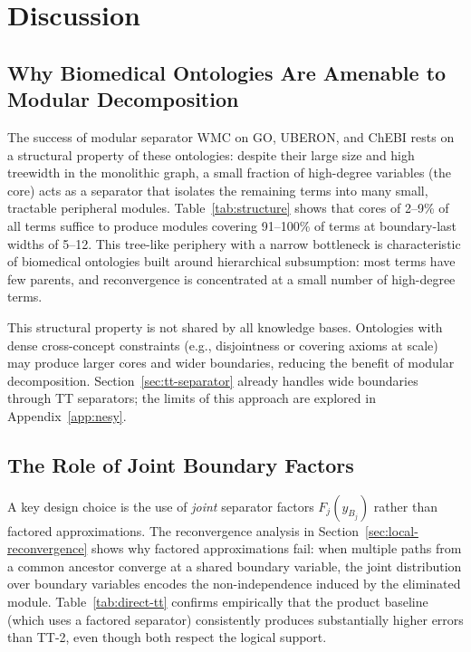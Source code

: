 \documentclass[12pt]{article}
\newcommand{\suppref}[1]{Appendix~\ref{#1}}
\begin{document}
\section{Discussion}
\label{sec:discussion}

\subsection{Why Biomedical Ontologies Are Amenable to Modular Decomposition}

The success of modular separator WMC on GO, UBERON, and ChEBI rests on
a structural property of these ontologies: despite their large size and
high treewidth in the monolithic graph, a small fraction of high-degree
variables (the core) acts as a separator that isolates the remaining
terms into many small, tractable peripheral modules. Table~\ref{tab:structure}
shows that cores of 2--9\% of all terms suffice to produce modules
covering 91--100\% of terms at boundary-last widths of 5--12. This
tree-like periphery with a narrow bottleneck is characteristic of
biomedical ontologies built around hierarchical subsumption: most terms
have few parents, and reconvergence is concentrated at a small number
of high-degree terms.

This structural property is not shared by all knowledge bases. Ontologies
with dense cross-concept constraints (e.g., disjointness or covering
axioms at scale) may produce larger cores and wider boundaries, reducing
the benefit of modular decomposition. Section~\ref{sec:tt-separator}
already handles wide boundaries through TT separators; the limits of
this approach are explored in \suppref{app:nesy}.

\subsection{The Role of Joint Boundary Factors}

A key design choice is the use of \emph{joint} separator factors
$F_j(y_{B_j})$ rather than factored approximations. The reconvergence
analysis in Section~\ref{sec:local-reconvergence} shows why factored
approximations fail: when multiple paths from a common ancestor
converge at a shared boundary variable, the joint distribution over
boundary variables encodes the non-independence induced by the
eliminated module. Table~\ref{tab:direct-tt} confirms empirically that
the product baseline (which uses a factored separator) consistently
produces substantially higher errors than TT-2, even though both
respect the logical support.
\end{document}
